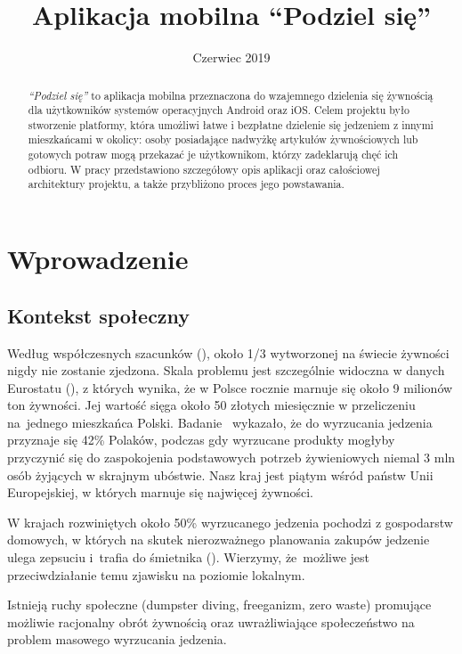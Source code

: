 \documentclass[licencjacka]{pracamgr}
\title{Aplikacja mobilna ``Podziel się''}
\date{Czerwiec 2019}
\begin{document}
\maketitle

\begin{abstract}
\textit{``Podziel się''} to aplikacja mobilna przeznaczona do wzajemnego dzielenia się żywnością dla użytkowników systemów operacyjnych Android oraz iOS\@. Celem projektu było stworzenie platformy, która umożliwi łatwe i bezpłatne dzielenie się jedzeniem z innymi mieszkańcami w okolicy: osoby posiadające nadwyżkę artykułów żywnościowych lub gotowych potraw mogą przekazać je użytkownikom, którzy zadeklarują chęć ich odbioru. W pracy przedstawiono szczegółowy opis aplikacji oraz całościowej architektury projektu, a także przybliżono proces jego powstawania.
\end{abstract}

\tableofcontents

\chapter*{Wprowadzenie}
\section*{Kontekst społeczny}
Według współczesnych szacunków (\cite{fao}), około 1/3 wytworzonej na świecie żywności nigdy nie zostanie zjedzona. Skala problemu jest szczególnie widoczna w danych Eurostatu (\cite{eurostat}), z których wynika, że w Polsce rocznie marnuje się około 9 milionów ton żywności. Jej wartość sięga około 50 złotych miesięcznie w przeliczeniu na~jednego mieszkańca Polski. Badanie~\cite{millward-brown} wykazało, że do wyrzucania jedzenia przyznaje się 42\% Polaków, podczas gdy wyrzucane produkty mogłyby przyczynić się do zaspokojenia podstawowych potrzeb żywieniowych niemal 3 mln osób żyjących w skrajnym ubóstwie. Nasz kraj jest piątym wśród państw Unii Europejskiej, w których marnuje się najwięcej żywności.

W krajach rozwiniętych około 50\% wyrzucanego jedzenia pochodzi z gospodarstw domowych, w których na skutek nierozważnego planowania zakupów jedzenie ulega zepsuciu i~trafia do śmietnika (\cite{polityka}). Wierzymy, że~możliwe jest przeciwdziałanie temu zjawisku na poziomie lokalnym.

Istnieją ruchy społeczne (dumpster diving, freeganizm, zero waste) promujące możliwie racjonalny obrót żywnością oraz uwrażliwiające społeczeństwo na problem masowego wyrzucania jedzenia.
\end{document}
